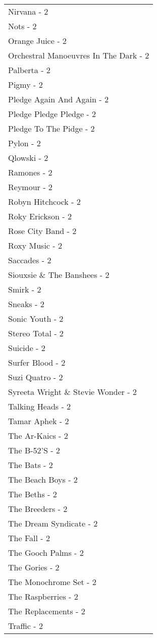 \documentclass[
]{article}
\begin{document}
\begin{longtable}{l}
Nirvana - 2 \\ 
Nots - 2 \\ 
Orange Juice - 2 \\ 
Orchestral Manoeuvres In The Dark - 2 \\ 
Palberta - 2 \\ 
Pigmy - 2 \\ 
Pledge Again And Again - 2 \\ 
Pledge Pledge Pledge - 2 \\ 
Pledge To The Pidge - 2 \\ 
Pylon - 2 \\ 
Qlowski - 2 \\ 
Ramones - 2 \\ 
Reymour - 2 \\ 
Robyn Hitchcock - 2 \\ 
Roky Erickson - 2 \\ 
Rose City Band - 2 \\ 
Roxy Music - 2 \\ 
Saccades - 2 \\ 
Siouxsie \& The Banshees - 2 \\ 
Smirk - 2 \\ 
Sneaks - 2 \\ 
Sonic Youth - 2 \\ 
Stereo Total - 2 \\ 
Suicide - 2 \\ 
Surfer Blood - 2 \\ 
Suzi Quatro - 2 \\ 
Syreeta Wright \& Stevie Wonder - 2 \\ 
Talking Heads - 2 \\ 
Tamar Aphek - 2 \\ 
The Ar-Kaics - 2 \\ 
The B-52'S - 2 \\ 
The Bats - 2 \\ 
The Beach Boys - 2 \\ 
The Beths - 2 \\ 
The Breeders - 2 \\ 
The Dream Syndicate - 2 \\ 
The Fall - 2 \\ 
The Gooch Palms - 2 \\ 
The Gories - 2 \\ 
The Monochrome Set - 2 \\ 
The Raspberries - 2 \\ 
The Replacements - 2 \\ 
Traffic - 2 \\ 

\end{longtable}
\end{document}
